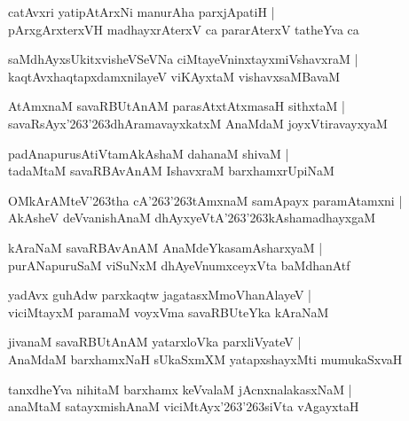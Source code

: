 \documentclass[twoside,12pt,openright]{book}
\def\S{\char'263}
\newcounter{shloka}[chapter]
\begin{document}
\begin{shloka}
catAvxri yatipAtArxNi manurAha parxjApatiH |\\
pArxgArxterxVH madhayxrAterxV ca pararAterxV tatheYva ca 
\end{shloka}

\begin{shloka}
saMdhAyxsUkitxvisheVSeVNa ciMtayeVninxtayxmiVshavxraM |\\
kaqtAvxhaqtapxdamxnilayeV viKAyxtaM vishavxsaMBavaM 
\end{shloka}

\begin{shloka}
AtAmxnaM savaRBUtAnAM parasAtxtAtxmasaH sithxtaM |\\
savaRsAyx\S\S dhAramavayxkatxM AnaMdaM joyxVtiravayxyaM 
\end{shloka}

\begin{shloka}
padAnapurusAtiVtamAkAshaM dahanaM shivaM |\\
tadaMtaM savaRBAvAnAM IshavxraM barxhamxrUpiNaM 
\end{shloka}

\begin{shloka}
OMkArAMteV\S tha cA\S\S tAmxnaM samApayx paramAtamxni |\\
AkAsheV deVvanishAnaM dhAyxyeVtA\S\S kAshamadhayxgaM 
\end{shloka}

\begin{shloka}
kAraNaM savaRBAvAnAM AnaMdeYkasamAsharxyaM |\\
purANapuruSaM viSuNxM dhAyeVnumxceyxVta baMdhanAtf 
\end{shloka}

\begin{shloka}
yadAvx guhAdw parxkaqtw jagatasxMmoVhanAlayeV |\\
viciMtayxM paramaM voyxVma savaRBUteYka kAraNaM
\end{shloka}

\begin{shloka}
jivanaM savaRBUtAnAM yatarxloVka parxliVyateV |\\
AnaMdaM barxhamxNaH sUkaSxmXM yatapxshayxMti mumukaSxvaH 
\end{shloka}

\begin{shloka}
tanxdheYva nihitaM barxhamx keVvalaM jAcnxnalakasxNaM |\\
anaMtaM satayxmishAnaM viciMtAyx\S\S siVta vAgayxtaH
\end{shloka}
\end{document}

